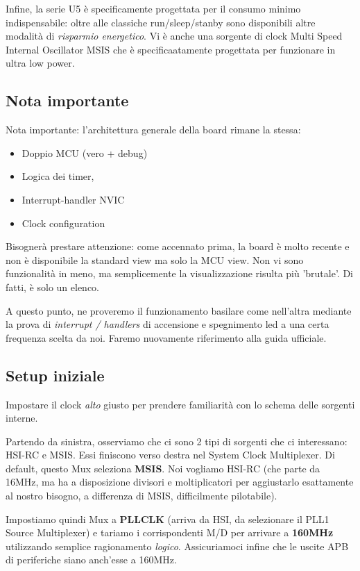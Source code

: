 Infine, la serie U5 è specificamente progettata per il consumo minimo indispensabile: oltre alle classiche run/sleep/stanby sono disponibili altre modalità di \textit{risparmio energetico}. Vi è anche una sorgente di clock Multi Speed Internal Oscillator MSIS che è specificaatamente progettata per funzionare in ultra low power.

\subsection{Nota importante}

Nota importante: l'architettura generale della board rimane la stessa: 
\begin{itemize}
    \item Doppio MCU (vero + debug)
    \item Logica dei timer,
    \item Interrupt-handler NVIC
    \item Clock configuration
\end{itemize}
Bisognerà prestare attenzione: come accennato prima, la board è molto recente e non è disponibile la standard view ma solo la MCU view. Non vi sono funzionalità in meno, ma semplicemente la visualizzazione risulta più 'brutale'. Di fatti, è solo un elenco.

A questo punto, ne proveremo il funzionamento basilare come nell'altra mediante la prova di \textit{interrupt / handlers} di accensione e spegnimento led a una certa frequenza scelta da noi. Faremo nuovamente riferimento alla guida ufficiale.

\subsection{Setup iniziale}

Impostare il clock \textit{alto} giusto per prendere familiarità con lo schema delle sorgenti interne.

Partendo da sinistra, osserviamo che ci sono 2 tipi di sorgenti che ci interessano: HSI-RC e MSIS. Essi finiscono verso destra nel System Clock Multiplexer. Di default, questo Mux seleziona \textbf{MSIS}. Noi vogliamo HSI-RC (che parte da 16MHz, ma ha a disposizione divisori e moltiplicatori per aggiustarlo esattamente al nostro bisogno, a differenza di MSIS, difficilmente pilotabile).

Impostiamo quindi Mux a \textbf{PLLCLK} (arriva da HSI, da selezionare il PLL1 Source Multiplexer) e tariamo i corrispondenti M/D per arrivare a \textbf{160MHz} utilizzando semplice ragionamento \textit{logico}. Assicuriamoci infine che le uscite APB di periferiche siano anch’esse a 160MHz.

